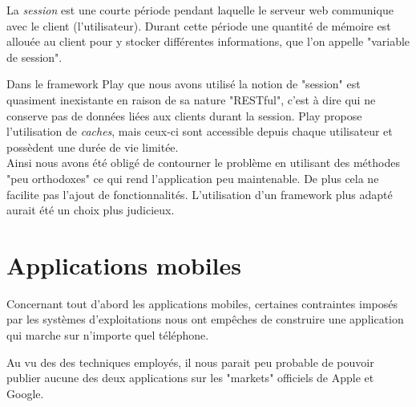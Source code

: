 La \textit{session} est une courte période pendant laquelle le serveur web communique avec le client (l'utilisateur).
Durant cette période une quantité de mémoire est allouée au client pour y stocker différentes informations, que l'on appelle "variable de session".

Dans le framework Play que nous avons utilisé la notion de "session" est quasiment inexistante en raison de sa nature "RESTful", c'est à dire qui ne conserve pas de données liées aux clients durant la session.
Play propose l'utilisation de \textit{caches}, mais ceux-ci sont accessible depuis chaque utilisateur et possèdent une durée de vie limitée.
\\


Ainsi nous avons été obligé de contourner le problème en utilisant des méthodes "peu orthodoxes" ce qui rend l'application peu maintenable.
De plus cela ne facilite pas l'ajout de fonctionnalités.
L'utilisation d'un framework plus adapté aurait été un choix plus judicieux.






\section{Applications mobiles}

Concernant tout d'abord les applications mobiles, certaines contraintes imposés par les systèmes d'exploitations nous ont empêches de construire une application qui marche sur n'importe quel téléphone.

Au vu des des techniques employés, il nous parait peu probable de pouvoir publier aucune des
deux applications sur les "markets" officiels de Apple et Google.




